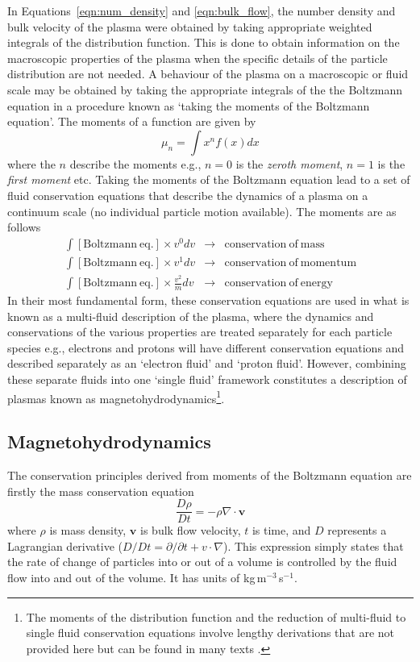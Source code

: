 In Equations~\ref{eqn:num_density} and \ref{eqn:bulk_flow}, the number density and bulk velocity of the plasma were obtained by taking appropriate weighted integrals of the distribution function. This is done to obtain information on the macroscopic properties of the plasma when the specific details of the particle distribution are not needed. A behaviour of the plasma on a macroscopic or fluid scale may be obtained by taking the appropriate integrals of the the Boltzmann equation in a procedure known as `taking the moments of the Boltzmann equation'. The moments of a function are given by 
\begin{equation}
\mu_n = \int x^n f(x) dx
\end{equation}
where the $n$ describe the moments e.g., $n=0$ is the {\it zeroth moment},  $n=1$ is the {\it first moment} etc. Taking the moments of the Boltzmann equation lead to a set of fluid conservation equations that describe the dynamics of a plasma on a continuum scale (no individual particle motion available). The moments are as follows
\begin{eqnarray*}
\int [\mathrm{Boltzmann~ eq.}]\times v^0 dv &\rightarrow& \mathrm{conservation~of~mass} \\
\int [\mathrm{Boltzmann~eq.}]\times v^1 dv &\rightarrow& \mathrm{conservation~of~momentum} \\
\int [\mathrm{Boltzmann~eq.}]\times \frac{v^2}{m} dv &\rightarrow& \mathrm{conservation~of~energy}
\end{eqnarray*}
In their most fundamental form, these conservation equations are used in what is known as a multi-fluid description of the plasma, where the dynamics and conservations of the various properties are treated separately for each particle species e.g., electrons and protons will have different conservation equations and described separately as an \textquoteleft electron fluid' and \textquoteleft proton fluid'. However, combining these separate fluids into one \textquoteleft single fluid' framework constitutes a description of plasmas known as magnetohydrodynamics\footnote{The moments of the distribution function and the reduction of multi-fluid to single fluid conservation equations involve lengthy derivations that are not provided here but can be found in many texts \citep{goossens2003, inan2011}.}.

\subsection{Magnetohydrodynamics}\label{sec:12}
The conservation principles  derived from moments of the Boltzmann equation are firstly the mass conservation equation
\begin{equation}
\frac{D\rho}{Dt} = -\rho\nabla\cdot \mathbf{v}
\end{equation}
where $\rho$ is mass density, $\mathbf{v}$ is bulk flow velocity, $t$ is time, and $D$ represents a Lagrangian derivative ($D/Dt = \partial /\partial t + v\cdot \nabla$). This expression simply states that the rate of change of particles into or out of a volume is controlled by the fluid flow into and out of the volume. It has units of kg\,m$^{-3}$\,s$^{-1}$.

